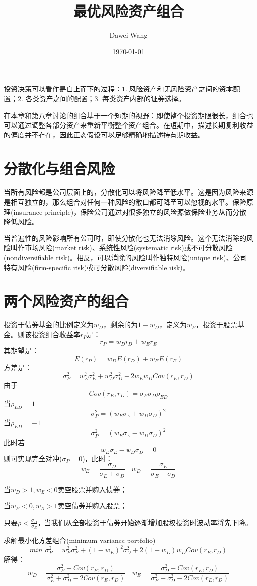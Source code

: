 \documentclass{article}
\title{最优风险资产组合}
\author{Dawei Wang}
\date{\today}
\begin{document}
	\maketitle
投资决策可以看作是自上而下的过程：1. 风险资产和无风险资产之间的资本配置；2. 各类资产之间的配置；3. 每类资产内部的证券选择。

在本章和第八章讨论的组合基于一个短期的视野：即使整个投资期限很长，组合也可以通过调整各部分资产来重新平衡整个资产组合。在短期中，描述长期复利收益的偏度并不存在，因此正态假设可以足够精确地描述持有期收益。
\section{分散化与组合风险}
当所有风险都是公司层面上的，分散化可以将风险降至低水平。这是因为风险来源是相互独立的，那么组合对任何一种风险的敞口都可降至可以忽视的水平。保险原理(insurance principle)，保险公司通过对很多独立的风险源做保险业务从而分散降低风险。

当普遍性的风险影响所有公司时，即使分散化也无法消除风险。这个无法消除的风险叫作市场风险(market risk)、系统性风险(systematic risk)或不可分散风险(nondiversifiable risk)。相反，可以消除的风险叫作独特风险(unique risk)、公司特有风险(firm-specific risk)或可分散风险(diversifiable risk)。

\section{两个风险资产的组合}
投资于债券基金的比例定义为$ w_D $，剩余的为$ 1-w_D $，定义为$ w_E $，投资于股票基金。则该投资组合收益率$ r_P $是：
\[
r_P=w_Dr_D+w_Er_E
\]
其期望是：
\[
E(r_P)=w_DE(r_D)+w_EE(r_E)
\]
方差是：
\[
\sigma^2_P=w_E^2\sigma^2_E+w_D^2\sigma^2_D+2w_Ew_DCov(r_E,r_D)
\]
由于
\[
Cov(r_E,r_D)=\sigma_E\sigma_D\rho_{ED}
\]
当$ \rho_{ED}=1 $
\[
\sigma^2_P=(w_E\sigma_E+w_D\sigma_D)^2
\]
当$ \rho_{ED}=-1 $
\[
\sigma^2_P=(w_E\sigma_E-w_D\sigma_D)^2
\]
此时若
\[
w_E\sigma_E-w_D\sigma_D=0
\]
则可实现完全对冲($ \sigma_P=0 $)，此时：
\[
w_E=\frac{\sigma_D}{\sigma_E+\sigma_D}\quad w_D=\frac{\sigma_E}{\sigma_E+\sigma_D}
\]

当$ w_D>1,w_E<0 $卖空股票并购入债券；

当$ w_E<0,w_D>1 $卖空债券并购入股票；

只要$ \rho<\frac{\sigma_D}{\sigma_E} $，当我们从全部投资于债券开始逐渐增加股权投资时波动率将先下降。

\hspace*{\fill}

求解最小化方差组合(minimum-variance portfolio)
\[
min:\sigma^2_P=w_E^2\sigma^2_E+(1-w_E)^2\sigma^2_D+2(1-w_D)w_DCov(r_E,r_D)
\]
解得：
\[
w_D=\frac{\sigma_E^2-Cov(r_E,r_D)}{\sigma_E^2+\sigma_D^2-2Cov(r_E,r_D)}\quad w_E=\frac{\sigma_D^2-Cov(r_E,r_D)}{\sigma_E^2+\sigma_D^2-2Cov(r_E,r_D)}
\]
\end{document}

